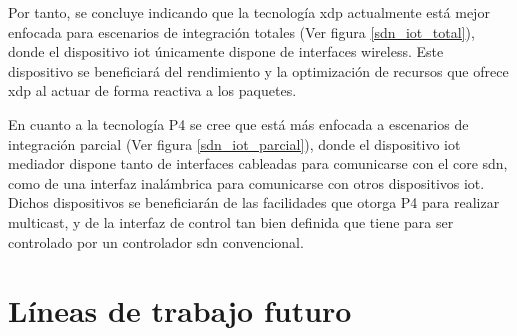 Por tanto, se concluye indicando que la tecnología \gls{xdp} actualmente está mejor enfocada para escenarios de integración totales (Ver figura \ref{sdn_iot_total}), donde el dispositivo \gls{iot} únicamente dispone de interfaces wireless. Este dispositivo se beneficiará del rendimiento y la optimización de recursos que ofrece \gls{xdp} al actuar de forma reactiva a los paquetes. \\
\par
En cuanto a la tecnología P4 se cree que está más enfocada a escenarios de integración parcial (Ver figura \ref{sdn_iot_parcial}), donde el dispositivo \gls{iot} mediador dispone tanto de interfaces cableadas para comunicarse con el core \gls{sdn}, como de una interfaz inalámbrica para comunicarse con otros dispositivos \gls{iot}. Dichos dispositivos se beneficiarán de las facilidades que otorga P4 para realizar multicast, y de la interfaz de control tan bien definida que tiene para ser controlado por un controlador \gls{sdn} convencional.
\vspace{2cm}




\newpage
\section{Líneas de trabajo futuro}
\label{trabajoFuturo}

